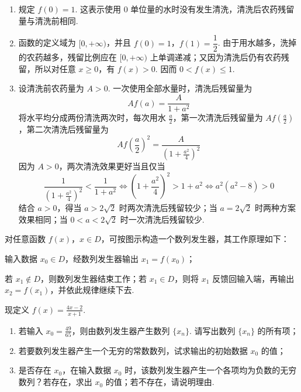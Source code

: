 \begin{solution}
\begin{enumerate}
\item 规定 \(f(0)=1\). 这表示使用 \(0\) 单位量的水时没有发生清洗，清洗后农药残留量与清洗前相同.
\item 函数的定义域为 \([0,+\infty)\)，并且 \(f(0)=1\)，\(f(1)=\dfrac{1}{2}\). 由于用水越多，洗掉的农药越多，残留比例应在 \([0,+\infty)\) 上单调递减；又因为清洗后仍有农药残留，所以对任意 \(x\geqslant0\)，有 \(f(x)>0\). 因而 \(0<f(x)\leqslant1\).
\item 设清洗前农药量为 \(A>0\). 一次使用全部水量时，清洗后残留量为
\[
A f(a)=\frac{A}{1+a^2}
\]
将水平均分成两份清洗两次时，每次用水 \(\frac{a}{2}\)，第一次清洗后残留量为 \(A f(\frac{a}{2})\)，第二次清洗后残留量为
\[
A f\left(\frac{a}{2}\right)^2=\frac{A}{\left(1+\frac{a^2}{4}\right)^2}
\]
因为 \(A>0\)，两次清洗效果更好当且仅当
\[
\frac{1}{\left(1+\frac{a^2}{4}\right)^2}<\frac{1}{1+a^2}
\Longleftrightarrow \left(1+\frac{a^2}{4}\right)^2>1+a^2
\Longleftrightarrow a^2(a^2-8)>0
\]
结合 \(a>0\)，得当 \(a>2\sqrt{2}\) 时两次清洗后残留较少；当 \(a=2\sqrt{2}\) 时两种方案效果相同；当 \(0<a<2\sqrt{2}\) 时一次清洗后残留较少.
\end{enumerate}
\end{solution}

\begin{problem}
对任意函数 \(f(x)\)，\(x\in D\)，可按图示构造一个数列发生器，其工作原理如下：
\begin{circlelist}
\item 输入数据 \(x_0\in D\)，经数列发生器输出 \(x_1=f(x_0)\)；
\item 若 \(x_1\notin D\)，则数列发生器结束工作；若 \(x_1\in D\)，则将 \(x_1\) 反馈回输入端，再输出 \(x_2=f(x_1)\)，并依此规律继续下去.
\end{circlelist}
现定义 \(f(x)=\frac{4x-2}{x+1}\).

\begin{enumerate}
\item 若输入 \(x_0=\frac{49}{65}\)，则由数列发生器产生数列 \(\{x_n\}\). 请写出数列 \(\{x_n\}\) 的所有项；
\item 若要数列发生器产生一个无穷的常数数列，试求输出的初始数据 \(x_0\) 的值；
\item 是否存在 \(x_0\)，在输入数据 \(x_0\) 时，该数列发生器产生一个各项均为负数的无穷数列？若存在，求出 \(x_0\) 的值；若不存在，请说明理由.
\end{enumerate}

\end{problem}


